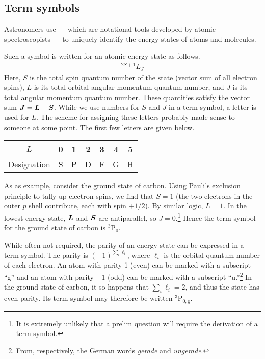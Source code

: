 \subsection{Term symbols}
 \newline

\noindent Astronomers use  --- which are notational tools developed by atomic spectroscopists --- to uniquely identify the energy states of atoms and molecules.

Such a symbol is written for an atomic energy state as follows.
\begin{align}
    ^{2S+1}L_J
\end{align}
Here, $S$ is the total spin quantum number of the state (vector sum of all electron spins), $L$ is its total orbital angular momentum quantum number, and $J$ is its total angular momentum quantum number. These quantities satisfy the vector sum $\vb*{J} = \vb*{L} + \vb*{S}$. While we use numbers for $S$ and $J$ in a term symbol, a letter is used for $L$. The scheme for assigning these letters probably made sense to someone at some point. The first few letters are given below.
\begin{center}
    \begin{tabular}{|c|cccccc|}
        \hline
        $L$ & 0 & 1 & 2 & 3 & 4 & 5 \\
        \hline
        Designation & S & P & D & F & G & H \\
        \hline
    \end{tabular}
\end{center}
As as example, consider the ground state of carbon. Using Pauli's exclusion principle to tally up electron spins, we find that $S = 1$ (the two electrons in the outer $p$ shell contribute, each with spin $+1/2$). By similar logic, $L = 1$. In the lowest energy state, $\vb*{L}$ and $\vb*{S}$ are antiparallel, so $J = 0$.\footnote{It is extremely unlikely that a prelim question will require the derivation of a term symbol.} Hence the term symbol for the ground state of carbon is $^3$P$_0$.

While often not required, the parity of an energy state can be expressed in a term symbol. The parity is $(-1)^{\sum_i \ell_i}$, where $\ell_i$ is the orbital quantum number of each electron. An atom with parity 1 (even) can be marked with a subscript ``g'' and an atom with parity $-1$ (odd) can be marked with a subscript ``u.''\footnote{From, respectively, the German words \textit{gerade} and \textit{ungerade}.} In the ground state of carbon, it so happens that $\sum_i \ell_i = 2$, and thus the state has even parity. Its term symbol may therefore be written $^3$P$_{0,\text{g}}$.

